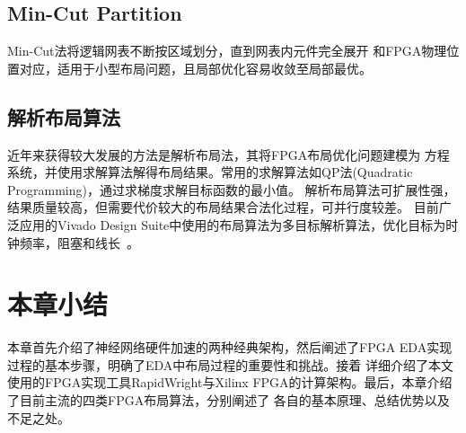 \subsection{Min-Cut Partition}
Min-Cut法将逻辑网表不断按区域划分，直到网表内元件完全展开
和FPGA物理位置对应，适用于小型布局问题，且局部优化容易收敛至局部最优。

\subsection{解析布局算法}
近年来获得较大发展的方法是解析布局法，其将FPGA布局优化问题建模为
方程系统，并使用求解算法解得布局结果。常用的求解算法如QP法(Quadratic Programming)，通过求梯度求解目标函数的最小值。
解析布局算法可扩展性强，结果质量较高，但需要代价较大的布局结果合法化过程，可并行度较差。
目前广泛应用的Vivado Design Suite中使用的布局算法为多目标解析算法，优化目标为时钟频率，阻塞和线长~\cite{wp416-vivado-user-guide}。



\section{本章小结}

本章首先介绍了神经网络硬件加速的两种经典架构，然后阐述了FPGA EDA实现过程的基本步骤，明确了EDA中布局过程的重要性和挑战。接着
详细介绍了本文使用的FPGA实现工具RapidWright与Xilinx FPGA的计算架构。最后，本章介绍了目前主流的四类FPGA布局算法，分别阐述了
各自的基本原理、总结优势以及不足之处。


































































